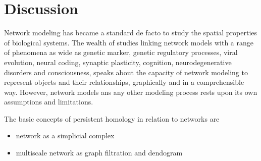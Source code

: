 \documentclass[onecollarge,runningheads]{svjour2}
\begin{document}
\section{Discussion}
\label{se:discuss}
Network modeling has became a standard de facto to study the spatial properties of biological systems. The wealth of studies linking network models with a range of phenomena as wide as genetic marker, genetic regulatory processes, viral evolution, neural coding, synaptic plasticity, cognition, neurodegenerative disorders and consciousness, speaks about the capacity of network modeling to represent objects and their relationships, graphically and in a comprehensible way. However, network models ans any other modeling process rests upon its own assumptions and limitations. 

The basic concepts of persistent homology in relation to networks are
\begin{itemize}
\item network as a simplicial complex
\item multiscale network as graph filtration and dendogram 
\end{itemize}
\end{document}
